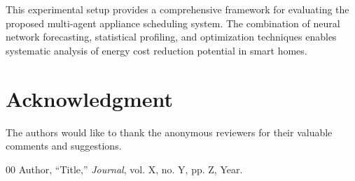 \documentclass[conference]{IEEEtran}
\begin{document}
This experimental setup provides a comprehensive framework for evaluating the proposed multi-agent appliance scheduling system. The combination of neural network forecasting, statistical profiling, and optimization techniques enables systematic analysis of energy cost reduction potential in smart homes.

\section*{Acknowledgment}
The authors would like to thank the anonymous reviewers for their valuable comments and suggestions.

\begin{thebibliography}{00}
 Author, ``Title,'' \textit{Journal}, vol. X, no. Y, pp. Z, Year.
\end{thebibliography}
\end{document}
